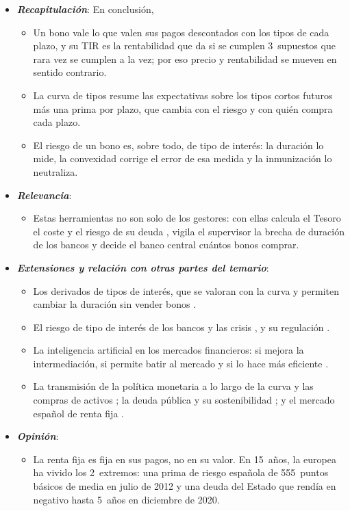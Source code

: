 \documentclass[11pt]{article}
\begin{document}
\begin{itemize}
\item \textbf{\emph{Recapitulación}}: En conclusión,
  \begin{itemize}
  \item Un bono vale lo que valen sus pagos descontados con los tipos de cada plazo, y su TIR es la rentabilidad que da si se cumplen 3~supuestos que rara vez se cumplen a la vez; por eso precio y rentabilidad se mueven en sentido contrario.
  \item La curva de tipos resume las expectativas sobre los tipos cortos futuros más una prima por plazo, que cambia con el riesgo y con quién compra cada plazo.
  \item El riesgo de un bono es, sobre todo, de tipo de interés: la duración lo mide, la convexidad corrige el error de esa medida y la inmunización lo neutraliza.
  \end{itemize}
\item \textbf{\emph{Relevancia}}:
  \begin{itemize}
  \item Estas herramientas no son solo de los gestores: con ellas calcula el Tesoro el coste y el riesgo de su deuda , vigila el supervisor la brecha de duración de los bancos y decide el banco central cuántos bonos comprar.
  \end{itemize}
\item \textbf{\emph{Extensiones y relación con otras partes del temario}}:
  \begin{itemize}
  \item Los derivados de tipos de interés, que se valoran con la curva y permiten cambiar la duración sin vender bonos .
  \item El riesgo de tipo de interés de los bancos y las crisis , y su regulación .
  \item La inteligencia artificial en los mercados financieros: si mejora la intermediación, si permite batir al mercado y si lo hace más eficiente .
  \item La transmisión de la política monetaria a lo largo de la curva y las compras de activos  ; la deuda pública y su sostenibilidad ; y el mercado español de renta fija .
  \end{itemize}
\item \textbf{\emph{Opinión}}:
  \begin{itemize}
  \item La renta fija es fija en sus pagos, no en su valor. En 15~años, la europea ha vivido los 2~extremos: una prima de riesgo española de 555~puntos básicos de media en julio de 2012\nocite{BCE2026IRS} y una deuda del Estado que rendía en negativo hasta 5~años en diciembre de 2020\nocite{BdE2026BE22}.

\end{itemize}
\end{itemize}
\end{document}
